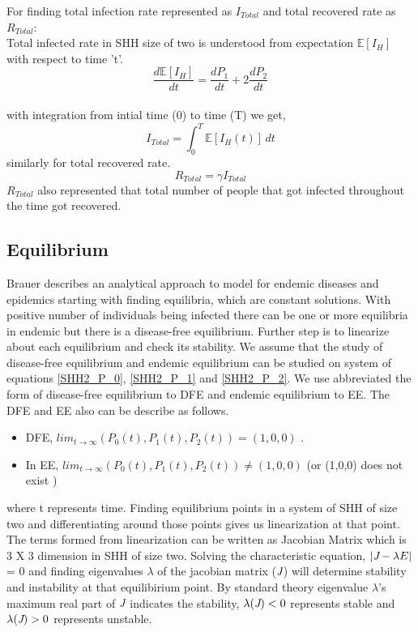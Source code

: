 \documentclass[paper=a4, fontsize=11pt, twoside, BCOR=12mm, parskip=full, listof=totoc]{scrreprt}
\begin{document}
For finding total infection rate represented as $I_{Total}$ and total recovered rate as $R_{Total}$: \\  
Total infected rate in SHH size of two is understood from expectation $\mathbb{E}[I_H]$ with respect to time 't'. 
$$ \frac{d\mathbb{E}[I_H]}{dt} = \frac{dP_1}{dt} + 2\frac{dP_2}{dt} $$\\
with integration from intial time (0) to time (T) we get,  
\begin{equation}
\label{Total Infection rate}
   I_{Total} =  \int_{0}^{T} \mathbb{E}[I_H(t)] \,dt  
\end{equation}
similarly for total recovered rate. 
\begin{equation}
\label{Total Recovered rate}
R_{Total} =  \gamma I_{Total} 
\end{equation}				
$R_{Total}$ also represented that total number of people that got infected throughout the time got recovered. 
\pagebreak
\subsection*{Equilibrium} 
Brauer \cite{brauer2017mathematical} describes an analytical approach to model for endemic diseases and epidemics starting with finding equilibria, which are constant solutions. With positive number of individuals being infected there can be one or more equilibria in endemic but there is a disease-free equilibrium. Further step is to linearize about each equilibrium and check its stability. We assume that the study of disease-free equilibrium and endemic equilibrium can be studied on system of  equations \ref{SHH2_P_0}, \ref{SHH2_P_1} and \ref{SHH2_P_2}. We use abbreviated the form of disease-free equilibrium to DFE and endemic equilibrium to EE. The DFE and EE also can be describe as follows.\\ 
\begin{itemize}
	\item DFE, $\displaystyle lim_{t\rightarrow\infty}(P_0(t),P_1(t),P_2(t)) = (1, 0, 0)$ . 
	\item In EE, $\displaystyle lim_{t\rightarrow\infty} (P_0(t),P_1(t),P_2(t)) \neq (1,0,0)$ (or (1,0,0) does not exist )
\end{itemize}
where t represents time. 
  Finding equilibrium points in a system of SHH of size two and differentiating around those points gives us linearization at that point. The terms formed from linearization can be written as Jacobian Matrix which is 3 X 3 dimension in SHH of size two. Solving the characteristic equation, \( | \emph{J} - \lambda E | \) = 0 and finding eigenvalues $\lambda$ of the jacobian matrix ($\emph{J}$) will determine stability and instability at that equilibirium point. By standard theory\cite{simonetal} eigenvalue $\lambda$'s maximum real part of $\emph{J}$ indicates the stability, $\lambda(\emph{J}) < 0 $ represents stable and $\lambda(\emph{J}) > 0 $ represents unstable.\\
  
\end{document}
